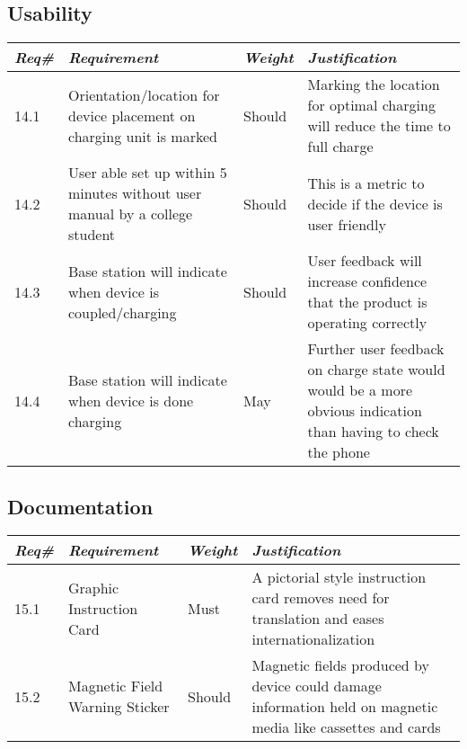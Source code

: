     \subsection{Usability }
        \begin{centering}
        \begin{tabular}{|l|m{7cm}|l|m{7cm}|}        \hline
        \textit{\textbf{Req\#}}	& \textit{\textbf{Requirement}} &\textit{\textbf{Weight}}&\textit{\textbf{Justification}} \\ \hline
        14.1 & Orientation/location for device placement on charging unit is marked & Should & Marking the location for optimal charging will reduce the time to full charge\\ \hline
        14.2 & User able set up within 5 minutes without user manual by a college student & Should & This is a metric to decide if the device is user friendly \\ \hline
        14.3 & Base station will indicate when device is coupled/charging & Should & User feedback will increase confidence that the product is operating correctly                                \\ \hline
        14.4 & Base station will indicate when device is done charging & May& Further user feedback on charge state would would be a more obvious indication than having to check the phone \\ \hline
        \end{tabular}
        \end{centering}
        
    \subsection{Documentation}
        \begin{centering}
        \begin{tabular}{|l|m{7cm}|l|m{7cm}|} \hline
        \textit{\textbf{Req\#}}	& \textit{\textbf{Requirement}} &\textit{\textbf{Weight}}&\textit{\textbf{Justification}} \\ \hline        
        15.1 & Graphic Instruction Card & Must & A pictorial style instruction card removes need for translation and eases internationalization  \\ \hline      
        15.2 & Magnetic Field Warning Sticker & Should & Magnetic fields produced by device could damage information held on magnetic media like cassettes and cards  \\ \hline     
        \end{tabular}
        \end{centering}
        

\newpage